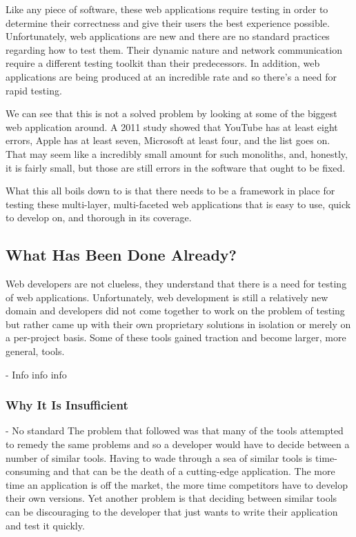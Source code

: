\documentclass[11pt]{article}
\begin{document}
Like any piece of software, these web applications require testing in order to determine their correctness and give their users the best experience possible. Unfortunately, web applications are new and there are no standard practices regarding how to test them. Their dynamic nature and network communication require a different testing toolkit than their predecessors. In addition, web applications are being produced at an incredible rate and so there's a need for rapid testing.

We can see that this is not a solved problem by looking at some of the biggest web application around. A 2011 study showed that YouTube has at least eight errors, Apple has at least seven, Microsoft at least four, and the list goes on. \cite{ErrorsInTheWild} That may seem like a incredibly small amount for such monoliths, and, honestly, it is fairly small, but those are still errors in the software that ought to be fixed.

What this all boils down to is that there needs to be a framework in place for testing these multi-layer, multi-faceted web applications that is easy to use, quick to develop on, and thorough in its coverage.

\subsection{What Has Been Done Already?}
Web developers are not clueless, they understand that there is a need for testing of web applications. Unfortunately, web development is still a relatively new domain and developers did not come together to work on the problem of testing but rather came up with their own proprietary solutions in isolation or merely on a per-project basis. Some of these tools gained traction and become larger, more general, tools. 

- Info info info

\subsubsection{Why It Is Insufficient}
- No standard
The problem that followed was that many of the tools attempted to remedy the same problems and so a developer would have to decide between a number of similar tools. Having to wade through a sea of similar tools is time-consuming and that can be the death of a cutting-edge application. The more time an application is off the market, the more time competitors have to develop their own versions. Yet another problem is that deciding between similar tools can be discouraging to the developer that just wants to write their application and test it quickly.
\end{document}
